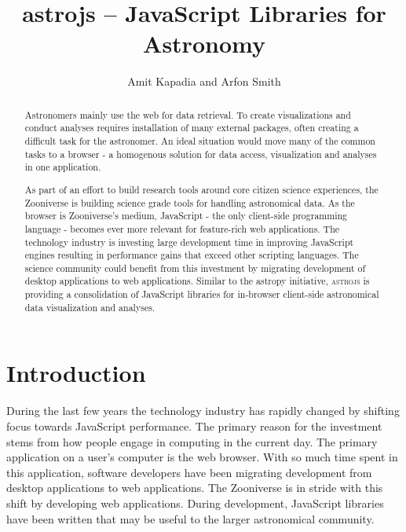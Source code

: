 
\resetcounters




\title{astrojs -- JavaScript Libraries for Astronomy}
\author{Amit Kapadia and Arfon Smith
}


\begin{abstract}
Astronomers mainly use the web for data retrieval. To create visualizations and conduct analyses requires installation of many external packages, often creating a difficult task for the astronomer. An ideal situation would move many of the common tasks to a browser - a homogenous solution for data access, visualization and analyses in one application.

As part of an effort to build research tools around core citizen science experiences, the Zooniverse is building science grade tools for handling astronomical data. As the browser is Zooniverse's medium, JavaScript - the only client-side programming language - becomes ever more relevant for feature-rich web applications. The technology industry is investing large development time in improving JavaScript engines resulting in performance gains that exceed other scripting languages. The science community could benefit from this investment by migrating development of desktop applications to web applications.  Similar to the astropy initiative, \textsc{astrojs} is providing a consolidation of JavaScript libraries for in-browser client-side astronomical data visualization and analyses.
\end{abstract}

\section{Introduction}
During the last few years the technology industry has rapidly changed by shifting focus towards JavaScript performance.  The primary reason for the investment stems from how people engage in computing in the current day.  The primary application on a user's computer is the web browser.  With so much time spent in this application, software developers have been migrating development from desktop applications to web applications.  The Zooniverse is in stride with this shift by developing web applications.  During development, JavaScript libraries have been written that may be useful to the larger astronomical community.

